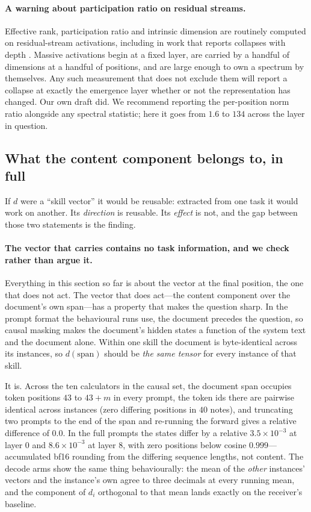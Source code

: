 \documentclass{article}
\newcommand{\dvec}{\ensuremath{d}}
\begin{document}
\paragraph{A warning about participation ratio on residual streams.} Effective
rank, participation ratio and intrinsic dimension are routinely computed on
residual-stream activations, including in work that reports collapses with depth
\citep{fernando2026residualspectral, sarkar2026causaldim}. Massive activations
begin at a fixed layer, are carried by a handful of dimensions at a handful of
positions, and are large enough to own a spectrum by themselves. Any such
measurement that does not exclude them will report a collapse at exactly the
emergence layer whether or not the representation has changed. Our own draft did.
We recommend reporting the per-position norm ratio alongside any spectral
statistic; here it goes from $1.6$ to $134$ across the layer in question.

\subsection{What the content component belongs to, in full}
\label{app:whose}

If $\dvec$ were a ``skill vector'' it would be reusable: extracted from one task
it would work on another. Its \emph{direction} is reusable. Its \emph{effect}
is not, and the gap between those two statements is the finding.

\paragraph{The vector that carries contains no task information, and we check
rather than argue it.} Everything in this section so far is about the vector at
the final position, the one that does not act. The vector that does act---the
content component over the document's own span---has a property that makes the
question sharp. In the prompt format the behavioural runs use, the document
precedes the question, so causal masking makes the document's hidden states a
function of the system text and the document alone. Within one skill the
document is byte-identical across its instances, so $\dvec(\text{span})$ should
be \emph{the same tensor} for every instance of that skill.

It is. Across the ten calculators in the causal set, the document span occupies
token positions $43$ to $43+m$ in every prompt, the token ids there are
pairwise identical across instances (zero differing positions in $40$ notes),
and truncating two prompts to the end of the span and re-running the forward
gives a relative difference of $0.0$. In the full prompts the states differ by a
relative $3.5\times10^{-3}$ at layer 0 and $8.6\times10^{-3}$ at layer 8, with
zero positions below cosine $0.999$---accumulated bf16 rounding from the
differing sequence lengths, not content. The decode arms show the same thing
behaviourally: the mean of the \emph{other} instances' vectors and the
instance's own agree to three decimals at every running mean, and the component
of $\dvec_i$ orthogonal to that mean lands exactly on the receiver's baseline.
\end{document}
